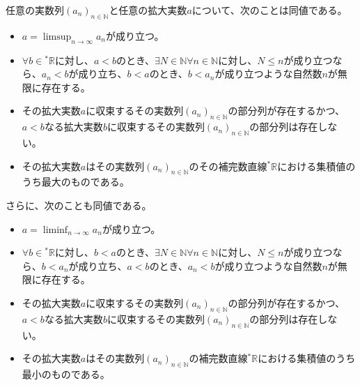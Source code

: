 \documentclass[dvipdfmx]{jsarticle}
\begin{document}
\begin{thm}\label{4.1.6.4}
任意の実数列$\left( a_{n} \right)_{n \in \mathbb{N}}$と任意の拡大実数$a$について、次のことは同値である。
\begin{itemize}
\item
  $a = \limsup_{n \rightarrow \infty}a_{n}$が成り立つ。
\item
  $\forall b \in{}^{*}\mathbb{R}$に対し、$a < b$のとき、$\exists N \in \mathbb{N}\forall n \in \mathbb{N}$に対し、$N \leq n$が成り立つなら、$a_{n} < b$が成り立ち、$b < a$のとき、$b < a_{n}$が成り立つような自然数$n$が無限に存在する。
\item
  その拡大実数$a$に収束するその実数列$\left( a_{n} \right)_{n \in \mathbb{N}}$の部分列が存在するかつ、$a < b$なる拡大実数$b$に収束するその実数列$\left( a_{n} \right)_{n \in \mathbb{N}}$の部分列は存在しない。
\item
  その拡大実数$a$はその実数列$\left( a_{n} \right)_{n \in \mathbb{N}}$のその補完数直線${}^{*}\mathbb{R}$における集積値のうち最大のものである。
\end{itemize}
さらに、次のことも同値である。
\begin{itemize}
\item
  $a = \liminf_{n \rightarrow \infty}a_{n}$が成り立つ。
\item
  $\forall b \in{}^{*}\mathbb{R}$に対し、$b < a$のとき、$\exists N \in \mathbb{N}\forall n \in \mathbb{N}$に対し、$N \leq n$が成り立つなら、$b < a_{n}$が成り立ち、$a < b$のとき、$a_{n} < b$が成り立つような自然数$n$が無限に存在する。
\item
  その拡大実数$a$に収束するその実数列$\left( a_{n} \right)_{n \in \mathbb{N}}$の部分列が存在するかつ、$a < b$なる拡大実数$b$に収束するその実数列$\left( a_{n} \right)_{n \in \mathbb{N}}$の部分列は存在しない。
\item
  その拡大実数$a$はその実数列$\left( a_{n} \right)_{n \in \mathbb{N}}$の補完数直線${}^{*}\mathbb{R}$における集積値のうち最小のものである。
\end{itemize}
\end{thm}
\end{document}
